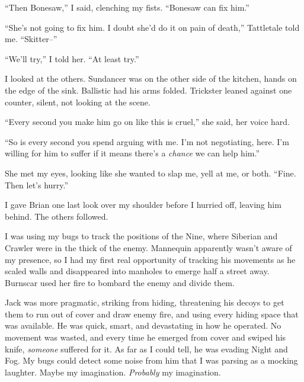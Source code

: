 ``Then Bonesaw,'' I said, clenching my fists.  ``Bonesaw can fix him.''



``She's not going to fix him.  I doubt she'd do it on pain of death,'' Tattletale told me.  ``Skitter--''



``We'll try,'' I told her.  ``At least try.''



I looked at the others.  Sundancer was on the other side of the kitchen, hands on the edge of the sink.  Ballistic had his arms folded.  Trickster leaned against one counter, silent, not looking at the scene.



``Every second you make him go on like this is cruel,'' she said, her voice hard.



``So is every second you spend arguing with me.  I'm not negotiating, here.  I'm willing for him to suffer if it means there's a \emph{chance }we can help him.''



She met my eyes, looking like she wanted to slap me, yell at me, or both.  ``Fine.  Then let's hurry.''



I gave Brian one last look over my shoulder before I hurried off, leaving him behind.  The others followed.



I was using my bugs to track the positions of the Nine, where Siberian and Crawler were in the thick of the enemy.  Mannequin apparently wasn't aware of my presence, so I had my first real opportunity of tracking his movements as he scaled walls and disappeared into manholes to emerge half a street away.  Burnscar used her fire to bombard the enemy and divide them.



Jack was more pragmatic, striking from hiding, threatening his decoys to get them to run out of cover and draw enemy fire, and using every hiding space that was available.  He was quick, smart, and devastating in how he operated.  No movement was wasted, and every time he emerged from cover and swiped his knife, \emph{someone }suffered for it.  As far as I could tell, he was evading Night and Fog.  My bugs could detect some noise from him that I was parsing as a mocking laughter.  Maybe my imagination.  \emph{Probably} my imagination.



